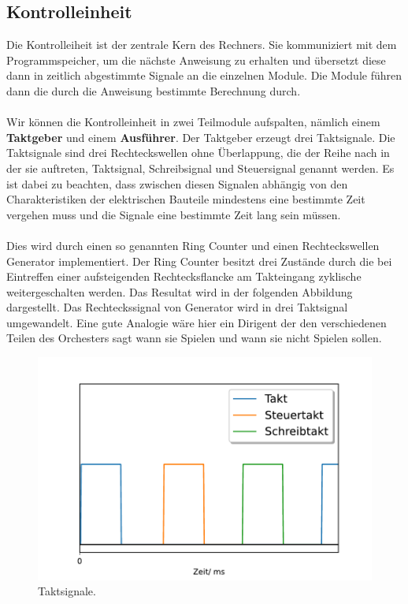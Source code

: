\documentclass[11pt,a4paper,leqno]{report}
\numberwithin{equation}{chapter}
\begin{document}
\subsection{Kontrolleinheit}
Die Kontrolleiheit ist der zentrale Kern des Rechners. Sie kommuniziert mit dem Programmspeicher, um die n\"achste Anweisung zu erhalten und \"ubersetzt diese dann in zeitlich abgestimmte Signale an die einzelnen Module. Die Module f\"uhren dann die durch die Anweisung bestimmte Berechnung durch.
\\
\\
Wir k\"onnen die Kontrolleinheit in zwei Teilmodule aufspalten, n\"amlich einem \textbf{Taktgeber} und einem \textbf{Ausf\"uhrer}. Der Taktgeber erzeugt drei Taktsignale.
Die Taktsignale sind drei Rechteckswellen ohne \"Uberlappung, die der Reihe nach in der sie auftreten, Taktsignal, Schreibsignal und Steuersignal genannt werden.
Es ist dabei zu beachten, dass zwischen diesen Signalen abh\"angig von den Charakteristiken der elektrischen Bauteile mindestens eine bestimmte Zeit vergehen muss und die Signale eine bestimmte Zeit lang sein m\"ussen.\\
\\
Dies wird durch einen so genannten Ring Counter und einen Rechteckswellen Generator implementiert. Der Ring Counter besitzt drei Zust\"ande durch die bei Eintreffen einer aufsteigenden Rechtecksflancke am Takteingang zyklische weitergeschalten werden. 
Das Resultat wird in der folgenden Abbildung dargestellt. Das Rechteckssignal von Generator wird in drei Taktsignal umgewandelt. Eine gute Analogie w\"are hier ein Dirigent der den verschiedenen Teilen des Orchesters sagt wann sie Spielen und wann sie nicht Spielen sollen.
\begin{figure}[H]
	\begin{center}
		\includegraphics[scale=0.6]{Bilder/tz.pdf}
		\caption{Taktsignale.}
	\end{center}
\end{figure}
\end{document}
